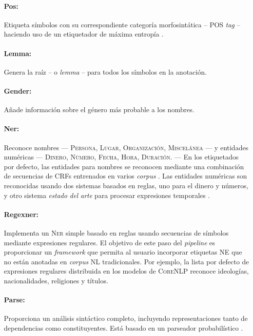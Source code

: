 \paragraph{Pos:} Etiqueta símbolos con su correspondiente categoría
morfosintática -- \ac{POS} \emph{tag} -- haciendo uso de un etiquetador de
máxima entropía \cite{Toutanova2003}.

\paragraph{Lemma:} Genera la raíz -- o \emph{lemma} -- para todos los símbolos
en la anotación.

\paragraph{Gender:} Añade información sobre el género más probable a los
nombres.

\paragraph{Ner:} Reconoce nombres --- \textsc{Persona, Lugar, Organización,
  Miscelánea} --- y entidades numéricas --- \textsc{Dinero, Número, Fecha, Hora,
  Duración}. --- En los etiquetados por defecto, las entidades para nombres se
reconocen mediante una combinación de secuencias de \acp{CRF} entrenados en
varios \emph{corpus} \cite{Finkel2005}. Las entidades numéricas son reconocidas
usando dos sistemas basados en reglas, uno para el dinero y números, y otro
sistema \emph{estado del arte} para procesar expresiones temporales
\cite{Chang2012}.

\paragraph{Regexner:} Implementa un \textsc{Ner} simple basado en reglas usando
secuencias de símbolos mediante expresiones regulares. El objetivo de este paso
del \emph{pipeline} es proporcionar un \emph{framework} que permita al usuario
incorporar etiquetas \textsc{NE} que no están anotadas en \emph{corpus}
\textsc{NL} tradicionales. Por ejemplo, la lista por defecto de expresiones
regulares distribuida en los modelos de \textsc{CoreNLP} reconoce ideologías,
nacionalidades, religiones y títulos.

\paragraph{Parse:} Proporciona un análisis sintáctico completo, incluyendo
representaciones tanto de dependencias como constituyentes. Está basado en un
parseador probabilístico \cite{Klein2002, deMarneffe2008}.

